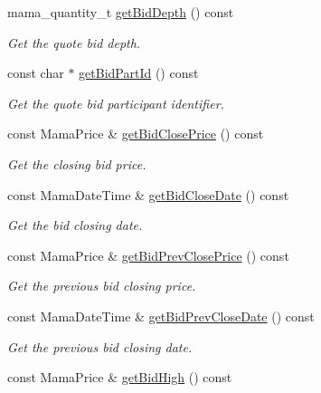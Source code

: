 \begin{CompactItemize}
mama\_\-quantity\_\-t \hyperlink{classWombat_1_1MamdaQuoteListener_3f4909f6e25bef5324df4c4fa89bda74}{get\-Bid\-Depth} () const 
\begin{CompactList}\small\item\em Get the quote bid depth. \item\end{CompactList}\item 
const char $\ast$ \hyperlink{classWombat_1_1MamdaQuoteListener_0256d6b1b2181919a00cf6d6e903b014}{get\-Bid\-Part\-Id} () const 
\begin{CompactList}\small\item\em Get the quote bid participant identifier. \item\end{CompactList}\item 
const Mama\-Price \& \hyperlink{classWombat_1_1MamdaQuoteListener_0c5bde1b3a4bfafdaef20c99c0c63c07}{get\-Bid\-Close\-Price} () const 
\begin{CompactList}\small\item\em Get the closing bid price. \item\end{CompactList}\item 
const Mama\-Date\-Time \& \hyperlink{classWombat_1_1MamdaQuoteListener_8b67bfdd143925309c46e4bb86a5a53f}{get\-Bid\-Close\-Date} () const 
\begin{CompactList}\small\item\em Get the bid closing date. \item\end{CompactList}\item 
const Mama\-Price \& \hyperlink{classWombat_1_1MamdaQuoteListener_637f9ad1c4a4523725dd5b9f12da169e}{get\-Bid\-Prev\-Close\-Price} () const 
\begin{CompactList}\small\item\em Get the previous bid closing price. \item\end{CompactList}\item 
const Mama\-Date\-Time \& \hyperlink{classWombat_1_1MamdaQuoteListener_e1cbe538d859cde30b322ca78616df43}{get\-Bid\-Prev\-Close\-Date} () const 
\begin{CompactList}\small\item\em Get the previous bid closing date. \item\end{CompactList}\item 
const Mama\-Price \& \hyperlink{classWombat_1_1MamdaQuoteListener_3f80653343c9fef6d788cf0ab4e33de7}{get\-Bid\-High} () const 

\end{CompactItemize}
